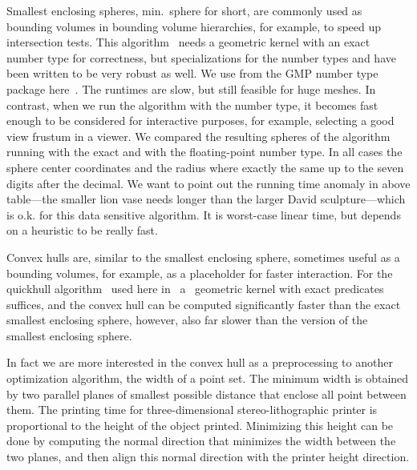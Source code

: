 Smallest enclosing spheres, min.~sphere for short, are commonly used
as bounding volumes in bounding volume hierarchies, for example, to
speed up intersection tests. This algorithm~\cite{fg-sebbc-03} needs a
geometric kernel with an exact number type for correctness, but
specializations for the number types  and
 have been written to be very robust as well. We use
 from the GMP number type package
here~\cite{cgal:g-gmpal-96}. The runtimes are slow, but still feasible
for huge meshes. In contrast, when we run the algorithm with the
 number type, it becomes fast enough to be considered
for interactive purposes, for example, selecting a good view frustum
in a viewer. We compared the resulting spheres of the algorithm
running with the exact and with the floating-point number type. In all
cases the sphere center coordinates and the radius where exactly the
same up to the seven digits after the decimal. We want to point out
the running time anomaly in above table---the smaller lion vase needs
longer than the larger David sculpture---which is o.k. for this data
sensitive algorithm. It is worst-case linear time, but depends on a
heuristic to be really fast.




Convex hulls are, similar to the smallest enclosing sphere, sometimes
useful as a bounding volumes, for example, as a placeholder for faster
interaction. For the quickhull algorithm~\cite{bdh-qach-96} used here
in \cgal\ a \cgal\ geometric kernel with exact predicates suffices,
and the convex hull can be computed significantly faster than the
exact smallest enclosing sphere, however, also far slower than the
 version of the smallest enclosing sphere.

In fact we are more interested in the convex hull as a preprocessing
to another optimization algorithm, the width of a point set. The
minimum width is obtained by two parallel planes of smallest possible
distance that enclose all point between them. The printing time for
three-dimensional stereo-lithographic printer is proportional to the
height of the object printed. Minimizing this height can be done by
computing the normal direction that minimizes the width between the
two planes, and then align this normal direction with the printer
height direction.

